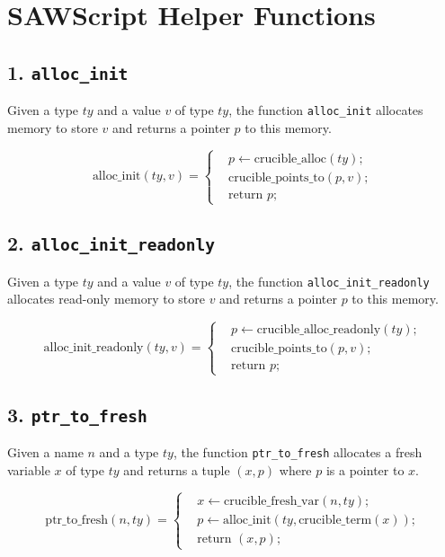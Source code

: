 \section*{SAWScript Helper Functions}

\subsection*{1. \texttt{alloc\_init}}

Given a type \( ty \) and a value \( v \) of type \( ty \), the function \texttt{alloc\_init} allocates memory to store \( v \) and returns a pointer \( p \) to this memory.

\[
\text{alloc\_init}(ty, v) = \left\{
\begin{aligned}
	& p \leftarrow \text{crucible\_alloc}(ty); \\
	& \text{crucible\_points\_to}(p, v); \\
	& \text{return } p;
\end{aligned}
\right.
\]

\subsection*{2. \texttt{alloc\_init\_readonly}}

Given a type \( ty \) and a value \( v \) of type \( ty \), the function \texttt{alloc\_init\_readonly} allocates read-only memory to store \( v \) and returns a pointer \( p \) to this memory.

\[
\text{alloc\_init\_readonly}(ty, v) = \left\{
\begin{aligned}
	& p \leftarrow \text{crucible\_alloc\_readonly}(ty); \\
	& \text{crucible\_points\_to}(p, v); \\
	& \text{return } p;
\end{aligned}
\right.
\]

\subsection*{3. \texttt{ptr\_to\_fresh}}

Given a name \( n \) and a type \( ty \), the function \texttt{ptr\_to\_fresh} allocates a fresh variable \( x \) of type \( ty \) and returns a tuple \( (x, p) \) where \( p \) is a pointer to \( x \).

\[
\text{ptr\_to\_fresh}(n, ty) = \left\{
\begin{aligned}
	& x \leftarrow \text{crucible\_fresh\_var}(n, ty); \\
	& p \leftarrow \text{alloc\_init}(ty, \text{crucible\_term}(x)); \\
	& \text{return } (x, p);
\end{aligned}
\right.
\]

